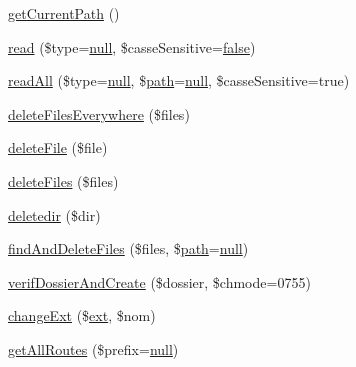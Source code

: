 \begin{DoxyCompactItemize}
\item 
\hyperlink{class_acme_group_1_1services_1_1aetools_1_1aetools_a844b26f17d248e5d13e340ab4996cf94}{get\+Current\+Path} ()
\item 
\hyperlink{class_acme_group_1_1services_1_1aetools_1_1aetools_aa5d8d26ec5f548a929635f479454b9ce}{read} (\$type=\hyperlink{validate_8js_afb8e110345c45e74478894341ab6b28e}{null}, \$casse\+Sensitive=\hyperlink{validate_8js_a5df37b7f02e5cdc7d9412b7f872b8e01}{false})
\item 
\hyperlink{class_acme_group_1_1services_1_1aetools_1_1aetools_a9dc005f4700b4849b357e55f3bd01251}{read\+All} (\$type=\hyperlink{validate_8js_afb8e110345c45e74478894341ab6b28e}{null}, \$\hyperlink{jquery_8mobile-1_83_81_8js_a85880b4fcfb12e8240a306187313f0b4}{path}=\hyperlink{validate_8js_afb8e110345c45e74478894341ab6b28e}{null}, \$casse\+Sensitive=true)
\item 
\hyperlink{class_acme_group_1_1services_1_1aetools_1_1aetools_ab412642b3cd803bafd37529b78e6567a}{delete\+Files\+Everywhere} (\$files)
\item 
\hyperlink{class_acme_group_1_1services_1_1aetools_1_1aetools_a25e22d60bbc907d8ce039074ae5148f7}{delete\+File} (\$file)
\item 
\hyperlink{class_acme_group_1_1services_1_1aetools_1_1aetools_a7f5ed883bc781d4e1cacb4631410b35d}{delete\+Files} (\$files)
\item 
\hyperlink{class_acme_group_1_1services_1_1aetools_1_1aetools_a076eaf997bee66e5d21143c259662d84}{deletedir} (\$dir)
\item 
\hyperlink{class_acme_group_1_1services_1_1aetools_1_1aetools_ad66dc6d93cd97a041dac665f8274d720}{find\+And\+Delete\+Files} (\$files, \$\hyperlink{jquery_8mobile-1_83_81_8js_a85880b4fcfb12e8240a306187313f0b4}{path}=\hyperlink{validate_8js_afb8e110345c45e74478894341ab6b28e}{null})
\item 
\hyperlink{class_acme_group_1_1services_1_1aetools_1_1aetools_a66a8f5524b22372f6e24bc6090f6f9d2}{verif\+Dossier\+And\+Create} (\$dossier, \$chmode=0755)
\item 
\hyperlink{class_acme_group_1_1services_1_1aetools_1_1aetools_a242034c653fc9d225667663e72962276}{change\+Ext} (\$\hyperlink{model_8ext_8js_a3ee7f56eeb48b6dc8bb1b162befb009f}{ext}, \$nom)
\item 
\hyperlink{class_acme_group_1_1services_1_1aetools_1_1aetools_a4c3253cdc0a94c727f97fcae588f9f17}{get\+All\+Routes} (\$prefix=\hyperlink{validate_8js_afb8e110345c45e74478894341ab6b28e}{null})
\item 

\end{DoxyCompactItemize}
